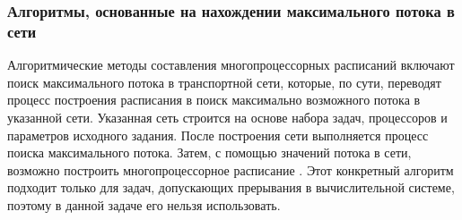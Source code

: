 \subsubsection{Алгоритмы, основанные на нахождении максимального потока в сети}

Алгоритмические методы составления многопроцессорных расписаний включают поиск максимального потока в транспортной сети, которые, по сути, переводят процесс построения расписания в поиск максимально возможного потока в указанной сети. Указанная сеть строится на основе набора задач, процессоров и параметров исходного задания. После построения сети выполняется процесс поиска максимального потока. Затем, с помощью значений потока в сети, возможно построить многопроцессорное расписание \cite{MAGIROU1989351}. Этот конкретный алгоритм подходит только для задач, допускающих прерывания в вычислительной системе, поэтому в данной задаче его нельзя использовать.






